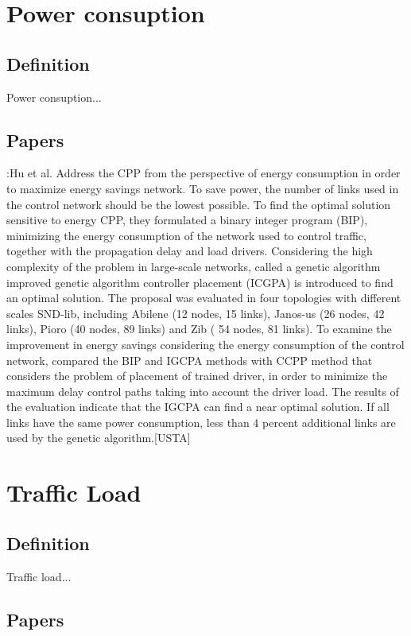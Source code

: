 \documentclass[a4paper,10pt]{article}
\begin{document}
\section{Power consuption}
\subsection{Definition}
Power consuption...

\subsection{Papers}
\cite{HuLu17}:Hu et al. Address the CPP from the perspective of energy consumption in order to maximize energy savings network. To save power, the number of links used in the control network should be the lowest possible. To find the optimal solution sensitive to energy CPP, they formulated a binary integer program (BIP), minimizing the energy consumption of the network used to control traffic, together with the propagation delay and load drivers. Considering the high complexity of the problem in large-scale networks, called a genetic algorithm improved genetic algorithm controller placement (ICGPA) is introduced to find an optimal solution.
The proposal was evaluated in four topologies with different scales SND-lib, including Abilene (12 nodes, 15 links), Janos-us (26 nodes, 42 links), Pioro (40 nodes, 89 links) and Zib ( 54 nodes, 81 links). To examine the improvement in energy savings considering the energy consumption of the control network, compared the BIP and IGCPA methods with CCPP method that considers the problem of placement of trained driver, in order to minimize the maximum delay control paths taking into account the driver load. The results of the evaluation indicate that the IGCPA can find a near optimal solution. If all links have the same power consumption, less than 4 percent additional links are used by the genetic algorithm.[USTA]

\section{Traffic Load}
\subsection{Definition}
Traffic load...

\subsection{Papers}
\end{document}
